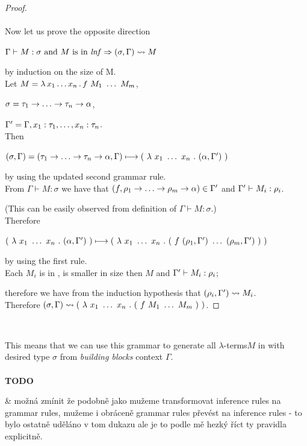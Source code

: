 \documentclass[12pt,a4paper]{report}
\newcommand{\lets}{let us\xspace}
\newcommand{\lterms}{$\lambda$-terms\xspace}
\newcommand{\tur}[3]{#1\vdash{}#2:#3}
\newcommand{\turst}[3]{$#1\vdash{}#2:#3$\xspace}
\newcommand{\GMS}{\turst{\Gamma}{M}{\sigma}}
\newenvironment{todo}
{ ~\\[0.5em]
  {\color{red}\textbf{TODO}}
  \begin{easylist}[itemize]}
{ \end{easylist}
  ~}
\begin{document}
\begin{proof}
~\\~\\

Now \lets prove the opposite direction 

$\tur{\Gamma}{M}{\sigma} \text{ and $M$ is in \textit{lnf}}
\then
(\sigma,\Gamma) \garr M$
   
by induction on the size of M.\\


Let $M = \lambda \, x_1 \dots x_n \, . \, f~M_1~\dots~M_m$,

$\sigma = \tau_1 \ar \dots \ar \tau_n \ar \alpha$,

$\Gamma^\prime = \Gamma , x_1:\tau_1 , \dots , x_n:\tau_n$.\\

Then

$
( \sigma , \Gamma ) =
( \tau_1 \ar \dots \ar \tau_n \ar \alpha , \Gamma )  
\gar
(~\lambda~x_1~\dots~x_n~.~
( \alpha , \Gp )~)
$

by using the updated second grammar rule.\\

From \GMS we have that $(f,\rho_1\ar\dots\ar\rho_m\ar\alpha) \in \Gp$
and $\tur{\Gp}{M_i}{\rho_i}$.

(This can be easily observed from definition of \GMS.)\\

Therefore 

$
(~\lambda~x_1~\dots~x_n~.~( \alpha , \Gamma^\prime )~)
\longmapsto
(~\lambda~x_1~\dots~x_n~.~
	(~f~( \rho_1 , \Gamma^\prime )~\dots~( \rho_m , \Gamma^\prime )~)
~)
$

by using the first rule.\\

Each $M_i$ is in \lnf, 
is smaller in size then $M$
and $\tur{\Gp}{M_i}{\rho_i}$; 

therefore we have from the induction hypothesis that 
$(\rho_i,\Gamma^\prime) \leadsto M_i$.\\

Therefore 
$
( \sigma , \Gamma )
\leadsto
(~\lambda~x_1~\dots~x_n~.~
	(~f~M_1~\dots~M_m~)
~)
$.
 
\end{proof}~


This means that we can use this grammar to generate all \lterms $M$ in \lnf
with desired type $\sigma$ from \textit{building blocks} context $\Gamma$.\\

\begin{todo}
 & možná zmínit že podobně jako mužeme transformovat inference rules
   na grammar rules, mužeme i obráceně grammar rules
   převést na inference rules - to bylo ostatně uděláno v tom dukazu ale
   je to podle mě hezký říct ty pravidla explicitně.
\end{todo}
\end{document}
